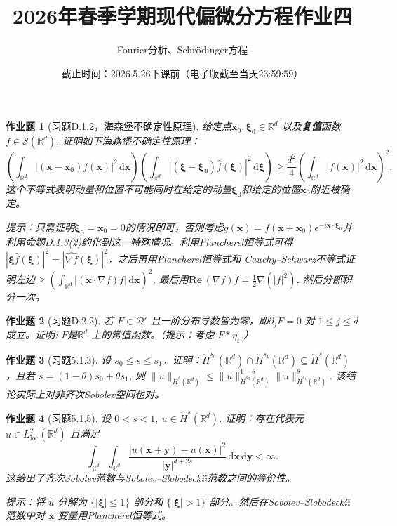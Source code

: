 \documentclass[UTF8,fontset=windows,12pt]{ctexart}
\theoremstyle{kaiti-theorem}
\newtheorem{problem}{作业题}
\numberwithin{equation}{section}
\renewcommand{\Re}{\textbf{Re}\,}
\newcommand{\R}{\mathbb{R}}
\newcommand{\bds}[1]{\boldsymbol{#1}}  %
\newcommand{\p}{\partial}
\newcommand{\DD}{\mathcal{D}}
\newcommand{\nab}{\nabla}
\newcommand{\dxx}{\,\mathrm{d}\bds{x}}
\newcommand{\xxi}{\boldsymbol{\xi}}
\newcommand{\dxxi}{\,\mathrm{d}\boldsymbol{\xi}}
\newcommand{\dyy}{\,\mathrm{d}\bds{y}}
\newcommand{\ird}{\int_{\R^d}}
\newcommand{\eps}{\varepsilon}
\newcommand{\xx}{{\bds{x}}}
\newcommand{\yy}{{\bds{y}}}
\begin{document}
\title{\LARGE{\bf  2026年春季学期现代偏微分方程作业四}}
\author{Fourier分析、Schr\"odinger方程}
\date{截止时间：2026.5.26下课前（电子版截至当天23:59:59）}

\maketitle

\begin{problem}[习题D.1.2，海森堡不确定性原理]\label{D-1:exe2}
给定点$\xx_0,\xxi_0\in \R^d$ 以及\textbf{复值}函数 $f\in\mathcal{S}(\R^d)$, 证明如下海森堡不确定性原理：
\begin{equation}
\left(\ird |(\xx-\xx_0)f(\xx)|^2\dxx\right)\left(\ird |(\xxi-\xxi_0)\hat{f}(\xxi)|^2\dxxi\right)\geqslant \frac{d^2}{4} \left(\ird |f(\xx)|^2\dxx\right)^2.
\end{equation} 这个不等式表明动量和位置不可能同时在给定的动量$\xxi_0$和给定的位置$\xx_0$附近被确定。

提示：只需证明$\xxi_0=\xx_0=0$的情况即可，否则考虑$g(\xx)=f(\xx+\xx_0)e^{-i\xx\cdot\xxi_0}$并利用命题D.1.3(2)约化到这一特殊情况。利用Plancherel恒等式可得 $|\xxi\hat{f}(\xxi)|^2=|\widehat{\nab f}(\xxi)|^2$，之后再用Plancherel恒等式和 Cauchy--Schwarz不等式证明左边$\geqslant (\ird |(\xx\cdot\nab f)f|\dxx)^2$, 最后用$\Re(\nab f)\bar{f}=\frac12 \nab(|f|^2)$, 然后分部积分一次。
\end{problem}

\begin{problem}[习题D.2.2] 若 $F\in\DD'$ 且一阶分布导数皆为零，即$\p_j F=0$ 对 $1\leqslant j\leqslant d$ 成立。证明: $F$是$\R^d$ 上的常值函数。（提示：考虑 $F*\eta_\eps$.）
\end{problem}


\begin{problem}[习题5.1.3]
设 $s_0\leqslant s\leqslant s_1$，证明：$\dot{H}^{s_0}(\R^d)\cap \dot{H}^{s_1}(\R^d)\subseteq \dot{H}^s(\R^d)$，且若 $s=(1-\theta)s_0+\theta s_1$, 则 $\|u\|_{\dot{H}^s(\R^d)}\leqslant \|u\|_{\dot{H}^{s_0}(\R^d)}^{1-\theta}\|u\|_{\dot{H}^{s_1}(\R^d)}^\theta.$ 该结论实际上对非齐次Sobolev空间也对。
\end{problem}


\begin{problem}[习题5.1.5]
设 $0<s<1,~u\in\dot{H}^s(\R^d)$. 证明：存在代表元 $u\in L_{\text{loc}}^2(\R^d)$ 且满足
\[
\int_{\R^d} \int_{\R^d} \frac{|u(\xx+\yy)-u(\xx)|^2}{|\yy|^{d+2s}}\dxx\dyy<\infty.
\]这给出了齐次Sobolev范数与Sobolev--Slobodecki\u{\i}范数之间的等价性。

提示：将 $\hat{u}$ 分解为 $\{|\xxi|\leqslant 1\}$ 部分和 $\{|\xxi|>1\}$ 部分。然后在Sobolev--Slobodecki\u{\i}范数中对 $\xx$ 变量用Plancherel恒等式。
\end{problem}
\end{document}
